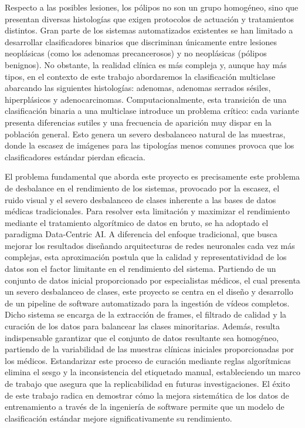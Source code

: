 ﻿\documentclass[10pt,a4paper,twocolumn,twoside]{article}
\begin{document}
Respecto a las posibles lesiones, los pólipos no son un grupo homogéneo, sino que presentan diversas histologías que exigen protocolos de actuación y tratamientos distintos. Gran parte de los sistemas automatizados existentes se han limitado a desarrollar clasificadores binarios que discriminan únicamente entre lesiones neoplásicas (como los adenomas precancerosos) y no neoplásicas (pólipos benignos). No obstante, la realidad clínica es más compleja y, aunque hay más tipos\cite{rex2012}, en el contexto de este trabajo abordaremos la clasificación multiclase abarcando las siguientes histologías: adenomas, adenomas serrados sésiles, hiperplásicos y adenocarcinomas. 
Computacionalmente, esta transición de una clasificación binaria a una multiclase introduce un problema crítico: cada variante presenta diferencias sutiles y una frecuencia de aparición muy dispar en la población general. Esto genera un severo desbalanceo natural de las muestras, donde la escasez de imágenes para las tipologías menos comunes provoca que los clasificadores estándar pierdan eficacia.

El problema fundamental que aborda este proyecto es precisamente este problema de desbalance en el rendimiento de los sistemas, provocado por la escasez, el ruido visual y el severo desbalanceo de clases inherente a las bases de datos médicas tradicionales. Para resolver esta limitación y maximizar el rendimiento mediante el tratamiento algorítmico de datos en bruto, se ha adoptado el paradigma Data-Centric AI\@. A diferencia del enfoque tradicional, que busca mejorar los resultados diseñando arquitecturas de redes neuronales cada vez más complejas, esta aproximación postula que la calidad y representatividad de los datos son el factor limitante en el rendimiento del sistema. Partiendo de un conjunto de datos inicial proporcionado por especialistas médicos, el cual presenta un severo desbalanceo de clases, este proyecto se centra en el diseño y desarrollo de un pipeline de software automatizado para la ingestión de vídeos completos. Dicho sistema se encarga de la extracción de frames, el filtrado de calidad y la curación de los datos para balancear las clases minoritarias. Además, resulta indispensable garantizar que el conjunto de datos resultante sea homogéneo, partiendo de la variabilidad de las muestras clínicas iniciales proporcionadas por los médicos. Estandarizar este proceso de curación mediante reglas algorítmicas elimina el sesgo y la inconsistencia del etiquetado manual, estableciendo un marco de trabajo que asegura que la replicabilidad en futuras investigaciones.
El éxito de este trabajo radica en demostrar cómo la mejora sistemática de los datos de entrenamiento a través de la ingeniería de software permite que un modelo de clasificación estándar mejore significativamente su rendimiento.
\end{document}
